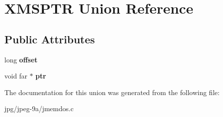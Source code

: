 \hypertarget{union_x_m_s_p_t_r}{\section{X\+M\+S\+P\+T\+R Union Reference}
\label{union_x_m_s_p_t_r}
}
\subsection*{Public Attributes}
\begin{DoxyCompactItemize}
\item 
\hypertarget{union_x_m_s_p_t_r_a00381983c7dc80dbfb1261004d25806c}{long {\bfseries offset}}\label{union_x_m_s_p_t_r_a00381983c7dc80dbfb1261004d25806c}

\item 
\hypertarget{union_x_m_s_p_t_r_a66328229e94351ef0fbd263aa2e5662c}{void far $\ast$ {\bfseries ptr}}\label{union_x_m_s_p_t_r_a66328229e94351ef0fbd263aa2e5662c}

\end{DoxyCompactItemize}


The documentation for this union was generated from the following file\+:\begin{DoxyCompactItemize}
\item 
jpg/jpeg-\/9a/jmemdos.\+c\end{DoxyCompactItemize}
